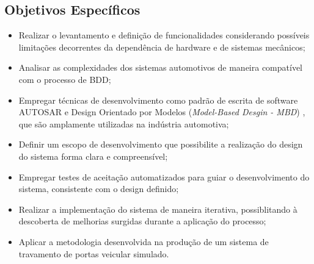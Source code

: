 \subsection{Objetivos Específicos}
\begin{itemize}
    \item Realizar o levantamento e definição de funcionalidades considerando possíveis limitações decorrentes da dependência de hardware e de sistemas mecânicos;
	\item Analisar as complexidades dos sistemas automotivos de maneira compatível com o processo de BDD;
    \item Empregar técnicas de desenvolvimento como padrão de escrita de software AUTOSAR \cite{autosarClassic} e Design Orientado por Modelos (\textit{Model-Based Desgin - MBD}) \cite{mathworksMBD2024}, que são amplamente utilizadas na indústria automotiva;
    \item Definir um escopo de desenvolvimento que possibilite a realização do design do sistema forma clara e compreensível;
    \item Empregar testes de aceitação automatizados para guiar o desenvolvimento do sistema, consistente com o design definido;
    \item Realizar a implementação do sistema de maneira iterativa, possiblitando à descoberta de melhorias surgidas durante a aplicação do processo;
    \item Aplicar a metodologia desenvolvida na produção de um sistema de travamento de portas veicular simulado.
\end{itemize}




